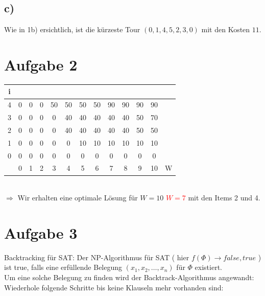 \documentclass[a4paper,11pt,twoside]{article}
\newcommand{\korr}[2]{\sout{#1} \textcolor{red}{\underline{#2}}}
\begin{document}
\subsection*{c)}
Wie in 1b) ersichtlich, ist die kürzeste Tour $(0,1,4,5,2,3,0)$ mit den Kosten $11$.
\section*{Aufgabe 2}
\begin{tabular}{|c|c|c|c|c|c|c|c|c|c|c|c|c|}
	\hline i &  &  &  &  &  &  &  &  &  &  &  &  \\ 
	\hline 4 & 0 & 0 & 0 & 50 & 50 & 50 & 50 & 90 & 90 & 90 & 90 &  \\ 
	\hline 3 & 0 & 0 & 0 & 0 & 40 & 40 & 40 & 40 & 40 & 50 & 70 &  \\ 
	\hline 2 & 0 & 0 & 0 & 0 & 40 & 40 & 40 & 40 & 40 & 50 & 50 &  \\ 
	\hline 1 & 0 & 0 & 0 & 0 & 0 & 10 & 10 & 10 & 10 & 10 & 10 &  \\ 
	\hline 0 & 0 & 0 & 0 & 0 & 0 & 0 & 0 & 0 & 0 & 0 & 0 &  \\ 
	\hline  & 0 & 1 & 2 & 3 & 4 & 5 & 6 & 7 & 8 & 9 & 10 & W \\ 
	\hline 
	\end{tabular} \\$\Rightarrow$ Wir erhalten eine optimale Lösung für \korr{$W=10$}{$W=7$} mit den Items 2 und 4.
\section*{Aufgabe 3}


Backtracking für SAT:
Der NP-Algorithmus für SAT ( hier $f(\Phi) \rightarrow {false, true}$ ) ist true, falls eine erfüllende Belegung $(x_1, x_2, \ldots, x_n)$ für $\Phi$ existiert.\\
Um eine solche Belegung zu finden wird der Backtrack-Algorithmus angewandt:\\

Wiederhole folgende Schritte bis keine Klauseln mehr vorhanden sind:\\
\end{document}
